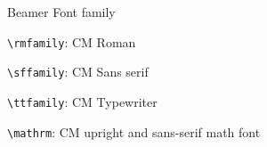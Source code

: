 \documentclass{beamer}
\begin{document}
\begin{frame}[fragile]{Beamer Font family}

\verb|\rmfamily|: \rmfamily CM Roman

\verb|\sffamily|: \sffamily CM Sans serif

\verb|\ttfamily|: \ttfamily CM Typewriter

\verb|\mathrm|: \mathrm CM upright and sans-serif math font

\end{frame}
\end{document}
